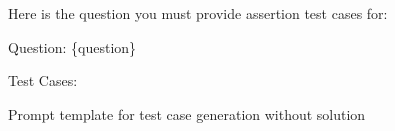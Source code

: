 \begin{figure*}[h]
\begin{tcolorbox}[title={Test Case Generation Without Solution Prompt}, colback=red!0, left=2pt,right=2pt,top=2pt,bottom=2pt]
{\vspace{0.3cm}
Here is the question you must provide assertion test cases for:

\vspace{0.3cm}
Question: \{question\}
\vspace{0.3cm}

Test Cases:
}
\end{tcolorbox}


  \caption{Prompt template for test case generation without solution}
  \label{fig:prompt_without_solutions}
  \vspace{-0.2in}
\end{figure*}
